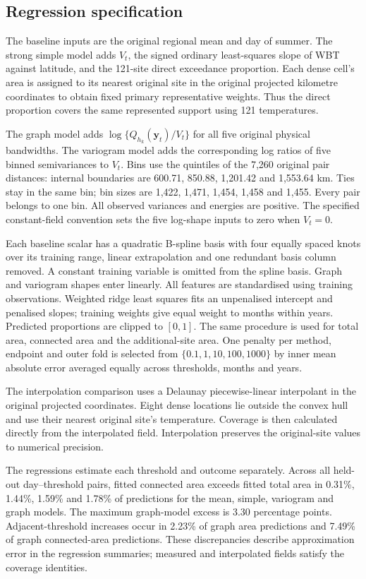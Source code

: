 \subsection{Regression specification}

The baseline inputs are the original regional mean and day of summer. The
strong simple model adds $V_t$, the signed ordinary least-squares slope of
WBT against latitude, and the 121-site direct exceedance proportion. Each
dense cell's area is assigned to its nearest original site in the original
projected kilometre coordinates to obtain fixed primary representative
weights. Thus the direct proportion covers the same represented support
using 121 temperatures.

The graph model adds $\log\{Q_{h_k}(\mathbf y_t)/V_t\}$ for all five
original physical bandwidths. The variogram model adds the corresponding
log ratios of five binned semivariances to $V_t$. Bins use the quintiles of
the 7,260 original pair distances: internal boundaries are 600.71, 850.88,
1,201.42 and 1,553.64 km. Ties stay in the same bin; bin sizes are 1,422,
1,471, 1,454, 1,458 and 1,455. Every pair belongs to one bin. All observed
variances and energies are positive. The specified constant-field convention
sets the five log-shape inputs to zero when $V_t=0$.

Each baseline scalar has a quadratic B-spline basis with four equally spaced
knots over its training range, linear extrapolation and one redundant basis
column removed. A constant training variable is omitted from the spline basis.
Graph and variogram shapes enter linearly. All features are standardised
using training observations. Weighted ridge least squares fits an
unpenalised intercept and penalised slopes; training weights give equal
weight to months within years. Predicted proportions are clipped to $[0,1]$.
The same procedure is used for total area, connected area and the
additional-site area. One penalty per method, endpoint and outer fold is
selected from $\{0.1,1,10,100,1000\}$ by inner mean absolute error averaged
equally across thresholds, months and years.

The interpolation comparison uses a Delaunay piecewise-linear interpolant
in the original projected coordinates. Eight dense locations lie outside
the convex hull and use their nearest original site's temperature. Coverage
is then calculated directly from the interpolated field. Interpolation
preserves the original-site values to numerical precision.

The regressions estimate each threshold and outcome separately. Across all
held-out day--threshold pairs, fitted connected area exceeds fitted total
area in 0.31\%, 1.44\%, 1.59\% and 1.78\% of predictions for the mean,
simple, variogram and graph models. The maximum graph-model excess is
3.30 percentage points. Adjacent-threshold increases occur in 2.23\% of
graph area predictions and 7.49\% of graph connected-area predictions.
These discrepancies describe approximation error in the regression summaries;
measured and interpolated fields satisfy the coverage identities.

